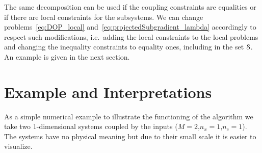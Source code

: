 \documentclass[../main.tex]{subfiles}
\begin{document}
\begin{remark}
  The same decomposition can be used if the coupling constraints are equalities or if there are local constraints for the subsystems.
  We can change problems~\eqref{eq:DOP_local} and~\eqref{eq:projectedSubgradient_lambda} accordingly to respect such modifications, i.e.\ adding the local constraints to the local problems and changing the inequality constraints to equality ones, including in the set $\mathcal{S}$.
  An example is given in the next section.
\end{remark}

\section{Example and Interpretations}\label{sec:example-interpr}
As a simple numerical example to illustrate the functioning of the algorithm we take two \mbox{$1$-dimensional} \siso{} systems coupled by the inputs ($M=2$,$n_{x}=1$,$n_{c}=1$).
The systems have no physical meaning but due to their small scale it is easier to visualize.
\end{document}
